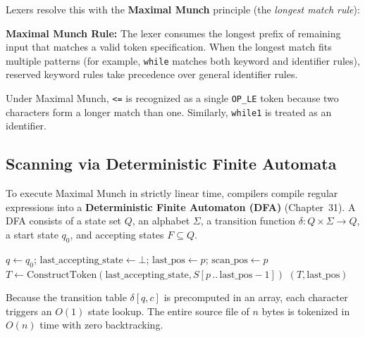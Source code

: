 Lexers resolve this with the \textbf{Maximal Munch} principle (the \emph{longest
match rule}):

\begin{formalbox}
\textbf{Maximal Munch Rule:} The lexer consumes the longest prefix of remaining
input that matches a valid token specification. When the longest match fits
multiple patterns (for example, \texttt{while} matches both keyword and identifier
rules), reserved keyword rules take precedence over general identifier rules.
\end{formalbox}

Under Maximal Munch, \texttt{<=} is recognized as a single \texttt{OP\_LE} token
because two characters form a longer match than one. Similarly, \texttt{while1}
is treated as an identifier.

\subsection{Scanning via Deterministic Finite Automata}

To execute Maximal Munch in strictly linear time, compilers compile regular
expressions into a \textbf{Deterministic Finite Automaton (DFA)}
(Chapter~31). A DFA consists of a state set $Q$, an alphabet
$\Sigma$, a transition function $\delta : Q \times \Sigma \to Q$, a start state
$q_0$, and accepting states $F \subseteq Q$.

\begin{algorithm}[H]
\caption{\textsc{DFA-Lexer-Next-Token}}
$q \leftarrow q_0$; \quad $\text{last\_accepting\_state} \leftarrow \bot$; \quad $\text{last\_pos} \leftarrow p$; \quad $\text{scan\_pos} \leftarrow p$\;
$T \leftarrow \text{ConstructToken}(\text{last\_accepting\_state}, S[p\,..\,\text{last\_pos}-1])$\;
\Return $(T, \text{last\_pos})$\;
\end{algorithm}

Because the transition table $\delta[q, c]$ is precomputed in an array, each
character triggers an $O(1)$ state lookup. The entire source file of $n$ bytes
is tokenized in $O(n)$ time with zero backtracking.

